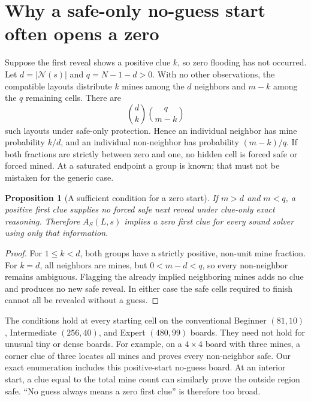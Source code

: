 \documentclass[11pt]{article}
\newtheorem{proposition}{Proposition}
\begin{document}
\section{Why a safe-only no-guess start often opens a zero}

Suppose the first reveal shows a positive clue $k$, so zero flooding has not occurred. Let $d=|\mathcal N(s)|$ and $q=N-1-d>0$. With no other observations, the compatible layouts distribute $k$ mines among the $d$ neighbors and $m-k$ among the $q$ remaining cells. There are
\begin{equation}
 \binom d k\binom q{m-k}
 \label{eq:firstcount}
\end{equation}
such layouts under safe-only protection. Hence an individual neighbor has mine probability $k/d$, and an individual non-neighbor has probability $(m-k)/q$. If both fractions are strictly between zero and one, no hidden cell is forced safe or forced mined. At a saturated endpoint a group is known; that must not be mistaken for the generic case.

\begin{proposition}[A sufficient condition for a zero start]
If $m>d$ and $m<q$, a positive first clue supplies no forced safe next reveal under clue-only exact reasoning. Therefore $A_S(L,s)$ implies a zero first clue for every sound solver using only that information.
\end{proposition}
\begin{proof}
For $1\le k<d$, both groups have a strictly positive, non-unit mine fraction. For $k=d$, all neighbors are mines, but $0<m-d<q$, so every non-neighbor remains ambiguous. Flagging the already implied neighboring mines adds no clue and produces no new safe reveal. In either case the safe cells required to finish cannot all be revealed without a guess.
\end{proof}

The conditions hold at every starting cell on the conventional Beginner $(81,10)$, Intermediate $(256,40)$, and Expert $(480,99)$ boards. They need not hold for unusual tiny or dense boards. For example, on a $4\times4$ board with three mines, a corner clue of three locates all mines and proves every non-neighbor safe. Our exact enumeration includes this positive-start no-guess board. At an interior start, a clue equal to the total mine count can similarly prove the outside region safe. ``No guess always means a zero first clue'' is therefore too broad.
\end{document}
